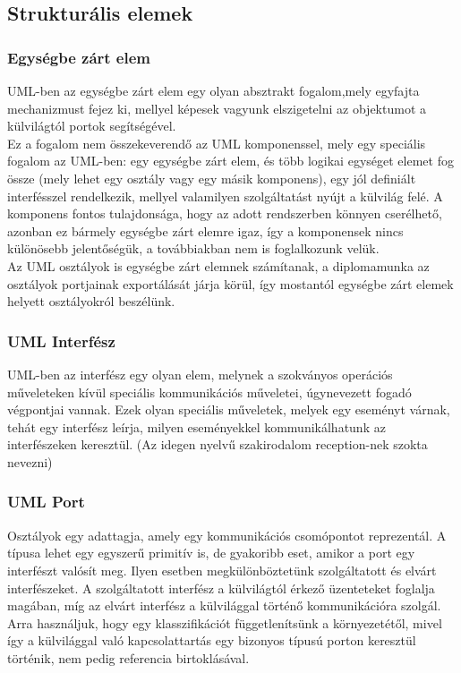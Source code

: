 \documentclass[a4paper,12pt]{report}
\begin{document}
\subsection{Strukturális elemek}
\subsubsection{Egységbe zárt elem} \label{class}
UML-ben az egységbe zárt elem egy olyan absztrakt fogalom,mely egyfajta mechanizmust fejez ki, mellyel képesek vagyunk elszigetelni az objektumot a külvilágtól portok segítségével.\\ Ez a fogalom nem összekeverendő az UML komponenssel, mely egy speciális fogalom az UML-ben: egy egységbe zárt elem, és több logikai egységet elemet fog össze (mely lehet egy osztály vagy egy másik komponens), egy jól definiált interfésszel rendelkezik, mellyel valamilyen szolgáltatást nyújt a külvilág felé. A komponens fontos tulajdonsága, hogy az adott rendszerben könnyen cserélhető, azonban ez bármely egységbe zárt elemre igaz, így a komponensek nincs különösebb jelentőségük, a továbbiakban nem is foglalkozunk velük. \\
Az UML osztályok is egységbe zárt elemnek számítanak, a diplomamunka az osztályok portjainak exportálását járja körül, így mostantól egységbe zárt elemek helyett osztályokról beszélünk.
\subsubsection{UML Interfész}
UML-ben az interfész egy olyan elem, melynek a szokványos operációs műveleteken kívül speciális kommunikációs műveletei, úgynevezett fogadó végpontjai  vannak. Ezek olyan speciális műveletek, melyek egy eseményt várnak, tehát egy interfész leírja, milyen eseményekkel kommunikálhatunk az interfészeken keresztül. (Az idegen nyelvű szakirodalom reception-nek szokta nevezni)
\subsubsection{UML Port}
Osztályok egy adattagja, amely egy kommunikációs csomópontot reprezentál. A típusa lehet egy egyszerű primitív is, de gyakoribb eset, amikor a port egy interfészt valósít meg. Ilyen esetben megkülönböztetünk szolgáltatott és elvárt interfészeket. A szolgáltatott interfész a külvilágtól érkező üzenteteket foglalja magában, míg az elvárt interfész a külvilággal történő kommunikációra szolgál. Arra használjuk, hogy egy klasszifikációt függetlenítsünk a környezetétől, mivel így a külvilággal való kapcsolattartás egy bizonyos típusú porton keresztül történik, nem pedig referencia birtoklásával.
\end{document}
